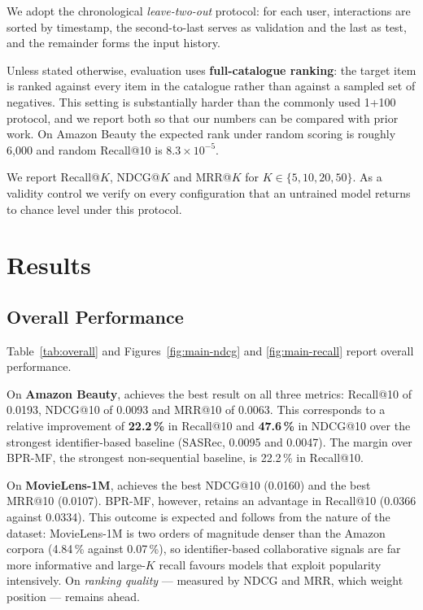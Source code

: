 We adopt the chronological \emph{leave-two-out} protocol: for each user,
interactions are sorted by timestamp, the second-to-last serves as validation
and the last as test, and the remainder forms the input history.

Unless stated otherwise, evaluation uses \textbf{full-catalogue ranking}: the
target item is ranked against every item in the catalogue rather than against a
sampled set of negatives. This setting is substantially harder than the
commonly used 1+100 protocol, and we report both so that our numbers can be
compared with prior work. On Amazon Beauty the expected rank under random
scoring is roughly 6{,}000 and random Recall@10 is $8.3\times 10^{-5}$.

We report Recall@$K$, NDCG@$K$ and MRR@$K$ for $K\in\{5,10,20,50\}$. As a
validity control we verify on every configuration that an untrained model
returns to chance level under this protocol.

\section{Results}
\label{sec:results}

\subsection{Overall Performance}
\label{sec:overall}

Table~\ref{tab:overall} and Figures~\ref{fig:main-ndcg} and
\ref{fig:main-recall} report overall performance.

On \textbf{Amazon Beauty}, \model{} achieves the best result on all three
metrics: Recall@10 of 0.0193, NDCG@10 of 0.0093 and MRR@10 of 0.0063. This
corresponds to a relative improvement of \textbf{22.2\,\%} in Recall@10 and
\textbf{47.6\,\%} in NDCG@10 over the strongest identifier-based baseline
(SASRec, 0.0095 and 0.0047). The margin over BPR-MF, the strongest
non-sequential baseline, is 22.2\,\% in Recall@10.

On \textbf{MovieLens-1M}, \model{} achieves the best NDCG@10 (0.0160) and the
best MRR@10 (0.0107). BPR-MF, however, retains an advantage in Recall@10 (0.0366
against 0.0334). This outcome is expected and follows from the nature of the
dataset: MovieLens-1M is two orders of magnitude denser than the Amazon corpora
(4.84\,\% against 0.07\,\%), so identifier-based collaborative signals are far
more informative and large-$K$ recall favours models that exploit popularity
intensively. On \emph{ranking quality} --- measured by NDCG and MRR, which
weight position --- \model{} remains ahead.

